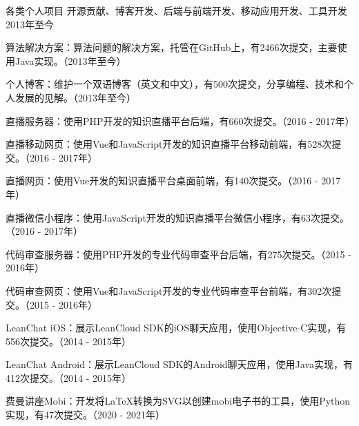 \begin{cventries}
  \cventry
    {各类个人项目} %
    {开源贡献、博客开发、后端与前端开发、移动应用开发、工具开发} %
    {} %
    {2013年至今} %
    {
      \begin{cvitems} %
        \item {算法解决方案：算法问题的解决方案，托管在GitHub上，有2466次提交，主要使用Java实现。（2013年至今）}
        \item {个人博客：维护一个双语博客（英文和中文），有500次提交，分享编程、技术和个人发展的见解。（2013年至今）}
        \item {直播服务器：使用PHP开发的知识直播平台后端，有660次提交。（2016 - 2017年）}
        \item {直播移动网页：使用Vue和JavaScript开发的知识直播平台移动前端，有528次提交。（2016 - 2017年）}
        \item {直播网页：使用Vue开发的知识直播平台桌面前端，有140次提交。（2016 - 2017年）}
        \item {直播微信小程序：使用JavaScript开发的知识直播平台微信小程序，有63次提交。（2016 - 2017年）}
        \item {代码审查服务器：使用PHP开发的专业代码审查平台后端，有275次提交。（2015 - 2016年）}
        \item {代码审查网页：使用Vue和JavaScript开发的专业代码审查平台前端，有302次提交。（2015 - 2016年）}
        \item {LeanChat iOS：展示LeanCloud SDK的iOS聊天应用，使用Objective-C实现，有556次提交。（2014 - 2015年）}
        \item {LeanChat Android：展示LeanCloud SDK的Android聊天应用，使用Java实现，有412次提交。（2014 - 2015年）}
        \item {费曼讲座Mobi：开发将LaTeX转换为SVG以创建mobi电子书的工具，使用Python实现，有47次提交。（2020 - 2021年）}
      \end{cvitems}
    }

\end{cventries}
